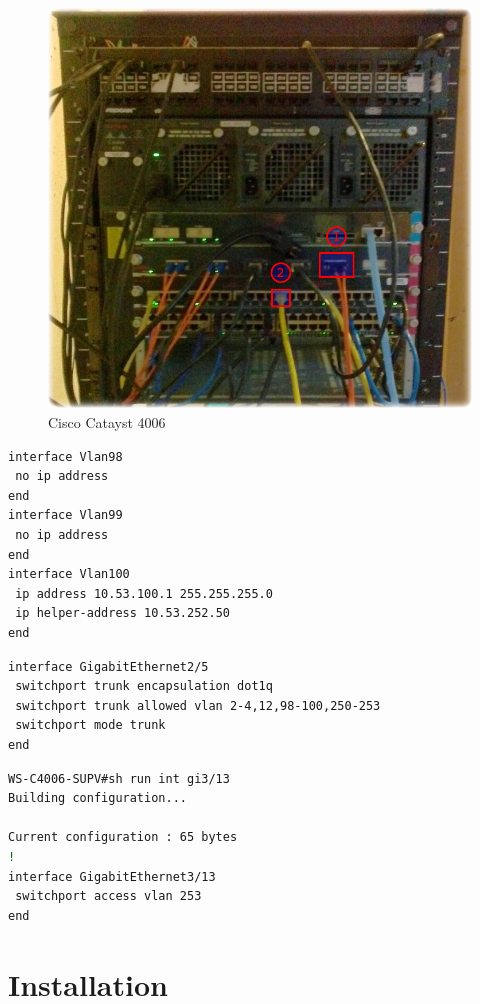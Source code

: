 \documentclass[11pt,letterpaper,oneside]{book}
\begin{document}
\begin{figure}
	\caption{Cisco Catayst 4006}
	\centering
\includegraphics[scale=.35]{./pictures/c4006.png} 
\end{figure}

\begin{lstlisting}[caption={VLAN Configuration},language=bash]
interface Vlan98 
 no ip address 
end 
interface Vlan99 
 no ip address 
end 
interface Vlan100 
 ip address 10.53.100.1 255.255.255.0 
 ip helper-address 10.53.252.50 
end 
\end{lstlisting}

\begin{lstlisting}[caption={Instance uplink interface; gi2/5; \#1},language=bash]
interface GigabitEthernet2/5 
 switchport trunk encapsulation dot1q 
 switchport trunk allowed vlan 2-4,12,98-100,250-253 
 switchport mode trunk 
end 
\end{lstlisting}

\begin{lstlisting}[caption={Management interface; gi3/13; \#2},language=bash]
WS-C4006-SUPV#sh run int gi3/13 
Building configuration... 

Current configuration : 65 bytes 
! 
interface GigabitEthernet3/13 
 switchport access vlan 253 
end 
\end{lstlisting}


\section{Installation}
\end{document}
